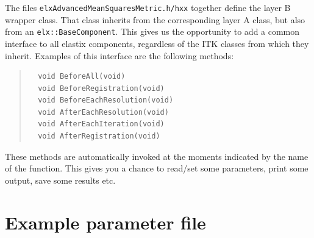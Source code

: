 \documentclass[]{report}
\begin{document}
The files \texttt{elxAdvancedMeanSquaresMetric.h/hxx} together define the layer
B wrapper class. That class inherits from the corresponding layer A class, but
also from an \texttt{elx::BaseComponent}. This gives us the opportunity to add
a common interface to all elastix components, regardless of the ITK classes
from which they inherit. Examples of this interface are the following methods:
\begin{quote}
\begin{verbatim}
  void BeforeAll(void)
  void BeforeRegistration(void)
  void BeforeEachResolution(void)
  void AfterEachResolution(void)
  void AfterEachIteration(void)
  void AfterRegistration(void)
\end{verbatim}
\end{quote}
These methods are automatically invoked at the moments indicated by the name of
the function. This gives you a chance to read/set some parameters, print some
output, save some results etc.



\appendix

\chapter{Example parameter file}\label{chp:ExampleParam}
\end{document}
